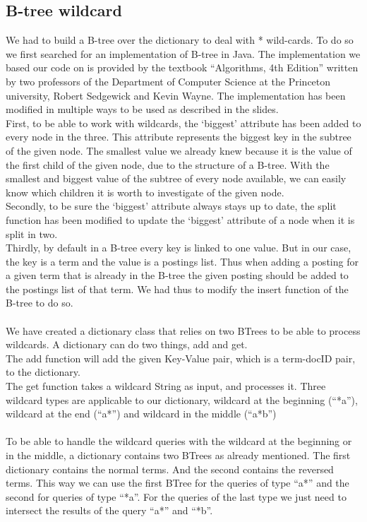 \documentclass{article}
\begin{document}
\subsection{B-tree wildcard}
We had to build a B-tree over the dictionary to deal with * wild-cards. To do so we first searched for an implementation of B-tree in Java. The implementation we based our code on is provided by the textbook ``Algorithms, 4th Edition'' written by two professors of the Department of Computer Science at the Princeton university,  Robert Sedgewick and Kevin Wayne.
The implementation has been modified in multiple ways to be used as described in the slides.\\
First, to be able to work with wildcards, the `biggest' attribute has been added to every node in the three. This attribute represents the biggest key in the subtree of the given node. The smallest value we already knew because it is the value of the first child of the given node, due to the structure of a B-tree. With the smallest and biggest value of the subtree of every node available, we can easily know which children it is worth to investigate of the given node.\\
Secondly, to be sure the `biggest' attribute always stays up to date, the split function has been modified to update the `biggest' attribute of a node when it is split in two. \\
Thirdly, by default in a B-tree every key is linked to one value. But in our case, the key is a term and the value is a postings list. Thus when adding a posting for a given term that is already in the B-tree the given posting should be added to the postings list of that term. We had thus to modify the insert function of the B-tree to do so.\\\\
We have created a dictionary class that relies on two BTrees to be able to process wildcards. A dictionary can do two things, add and get.\\
The add function will add the given Key-Value pair, which is a term-docID pair, to the dictionary.\\
The get function takes a wildcard String as input, and processes it. Three wildcard types are applicable to our dictionary, wildcard at the beginning (``*a''), wildcard at the end (``a*'') and wildcard in the middle (``a*b'')\\\\
To be able to handle the wildcard queries with the wildcard at the beginning or in the middle, a dictionary contains two BTrees as already mentioned. The first dictionary contains the normal terms. And the second contains the reversed terms. This way we can use the first BTree for the queries of type ``a*'' and the second for queries of type ``*a''. For the queries of the last type we just need to intersect the results of the query ``a*'' and ``*b''.
\end{document}
